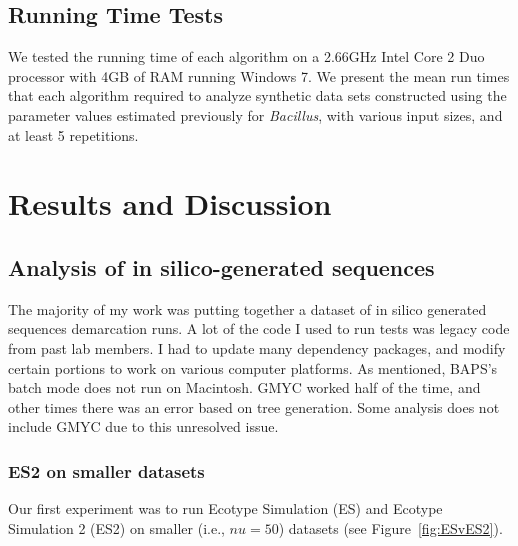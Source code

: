 \subsection*{Running Time Tests}
We tested the running time of each algorithm on a 2.66GHz Intel Core 2 Duo processor with 4GB of RAM running Windows 7.
We present the mean run times that each algorithm required to analyze synthetic data sets constructed using the parameter values estimated previously for \emph{Bacillus}, with various input sizes, and at least 5 repetitions.

\section{Results and Discussion}


\subsection*{Analysis of in silico-generated sequences}
The majority of my work was putting together a dataset of in silico generated sequences demarcation runs.
A lot of the code I used to run tests was legacy code from past lab members.
I had to update many dependency packages, and modify certain portions to work on various computer platforms.
As mentioned, BAPS's batch mode does not run on Macintosh.
GMYC worked half of the time, and other times there was an error based on tree generation.
Some analysis does not include GMYC due to this unresolved issue.

\subsubsection*{ES2 on smaller datasets}
Our first experiment was to run Ecotype Simulation (ES) and Ecotype Simulation 2 (ES2) on smaller (i.e., $nu = 50$) datasets (see Figure~\ref{fig:ESvES2}).

